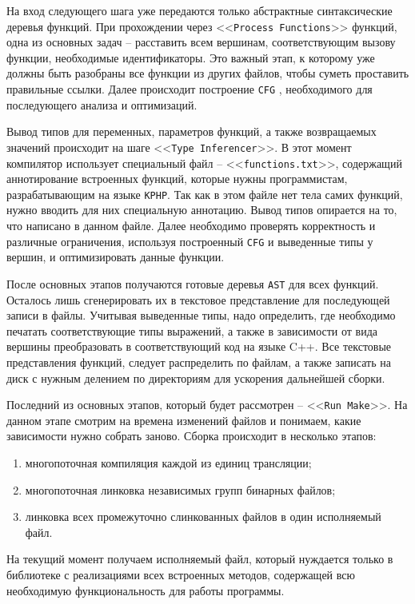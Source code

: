 На вход следующего шага уже передаются только абстрактные синтаксические деревья функций.
При прохождении через <<\verb|Process Functions|>>  функций, одна из основных задач -- расставить всем вершинам, соответствующим вызову функции, необходимые идентификаторы.
Это важный этап, к которому уже должны быть разобраны все функции из других файлов, чтобы суметь проставить правильные ссылки.
Далее происходит построение \verb|CFG| \cite{CFG}, необходимого для последующего анализа и оптимизаций.

Вывод типов для переменных, параметров функций, а также возвращаемых значений происходит на шаге <<\verb|Type Inferencer|>>.
В этот момент компилятор использует специальный файл -- <<\verb|functions.txt|>>, содержащий аннотирование встроенных функций, которые нужны программистам, разрабатывающим на языке \verb|KPHP|.
Так как в этом файле нет тела самих функций, нужно вводить для них специальную аннотацию.
Вывод типов опирается на то, что написано в данном файле.
Далее необходимо проверять корректность и различные ограничения, используя построенный \verb|CFG| и выведенные типы у вершин, и оптимизировать данные функции.

После основных этапов получаются готовые деревья \verb|AST| для всех функций.
Осталось лишь сгенерировать их в текстовое представление для последующей записи в файлы.
Учитывая выведенные типы, надо определить, где необходимо печатать соответствующие типы выражений, а также в зависимости от вида вершины преобразовать в соответствующий код на языке C++.
Все текстовые представления функций, следует распределить по файлам, а также записать на диск с нужным делением по директориям для ускорения дальнейшей сборки.

Последний из основных этапов, который будет рассмотрен -- <<\verb|Run Make|>>.
На данном этапе смотрим на времена изменений файлов и понимаем, какие зависимости нужно собрать заново.
Сборка происходит в несколько этапов:
\begin{enumerate}
  \item многопоточная компиляция каждой из единиц трансляции;
  \item многопоточная линковка независимых групп бинарных файлов;
  \item линковка всех промежуточно слинкованных файлов в один исполняемый файл.
\end{enumerate}

На текущий момент получаем исполняемый файл, который нуждается только в библиотеке с реализациями всех встроенных методов, содержащей всю необходимую функциональность для работы программы.

